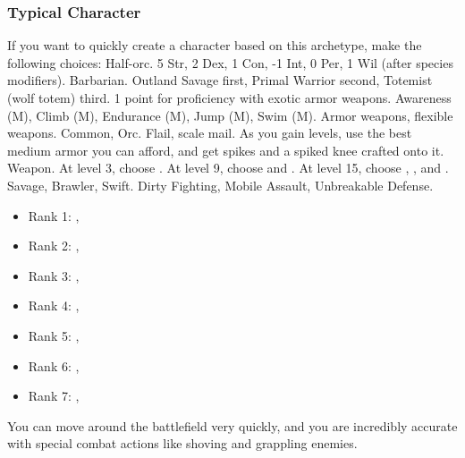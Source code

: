         \subsubsection{Typical Character}
            If you want to quickly create a character based on this archetype, make the following choices:
             Half-orc.
             5 Str, 2 Dex, 1 Con, -1 Int, 0 Per, 1 Wil (after species modifiers).
             Barbarian.
             Outland Savage first, Primal Warrior second, Totemist (wolf totem) third.
             1 point for proficiency with exotic armor weapons.
             Awareness (M), Climb (M), Endurance (M), Jump (M), Swim (M).
             Armor weapons, flexible weapons.
             Common, Orc.
             Flail, scale mail. As you gain levels, use the best medium armor you can afford, and get spikes and a spiked knee crafted onto it.
             Weapon.
                At level 3, choose .
                At level 9, choose  and .
                At level 15, choose , , and .
             Savage, Brawler, Swift.
             Dirty Fighting, Mobile Assault, Unbreakable Defense.
            \begin{itemize}
                \item Rank 1: , 
                \item Rank 2: , 
                \item Rank 3: , 
                \item Rank 4: , 
                \item Rank 5: , 
                \item Rank 6: , 
                \item Rank 7: , 
            \end{itemize}
             You can move around the battlefield very quickly, and you are incredibly accurate with special combat actions like shoving and grappling enemies.
